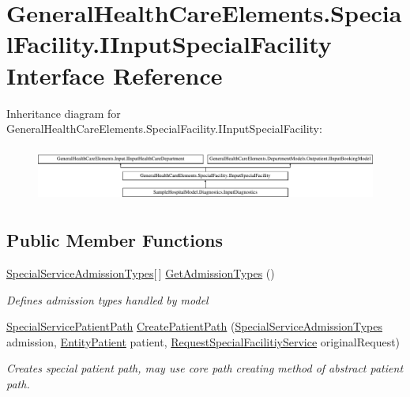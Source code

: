 \hypertarget{interface_general_health_care_elements_1_1_special_facility_1_1_i_input_special_facility}{}\section{General\+Health\+Care\+Elements.\+Special\+Facility.\+I\+Input\+Special\+Facility Interface Reference}
\label{interface_general_health_care_elements_1_1_special_facility_1_1_i_input_special_facility}
Inheritance diagram for General\+Health\+Care\+Elements.\+Special\+Facility.\+I\+Input\+Special\+Facility\+:\begin{figure}[H]
\begin{center}
\leavevmode
\includegraphics[height=1.814255cm]{interface_general_health_care_elements_1_1_special_facility_1_1_i_input_special_facility}
\end{center}
\end{figure}
\subsection*{Public Member Functions}
\begin{DoxyCompactItemize}
\item 
\hyperlink{class_general_health_care_elements_1_1_treatment_admission_types_1_1_special_service_admission_types}{Special\+Service\+Admission\+Types}\mbox{[}$\,$\mbox{]} \hyperlink{interface_general_health_care_elements_1_1_special_facility_1_1_i_input_special_facility_a5ff6abb9d0051ed2911d6d982da6b116}{Get\+Admission\+Types} ()
\begin{DoxyCompactList}\small\item\em Defines admission types handled by model \end{DoxyCompactList}\item 
\hyperlink{class_general_health_care_elements_1_1_special_facility_1_1_special_service_patient_path}{Special\+Service\+Patient\+Path} \hyperlink{interface_general_health_care_elements_1_1_special_facility_1_1_i_input_special_facility_a04adb110c4713d0f068165faacfc2e72}{Create\+Patient\+Path} (\hyperlink{class_general_health_care_elements_1_1_treatment_admission_types_1_1_special_service_admission_types}{Special\+Service\+Admission\+Types} admission, \hyperlink{class_general_health_care_elements_1_1_entities_1_1_entity_patient}{Entity\+Patient} patient, \hyperlink{class_general_health_care_elements_1_1_special_facility_1_1_request_special_facilitiy_service}{Request\+Special\+Facilitiy\+Service} original\+Request)
\begin{DoxyCompactList}\small\item\em Creates special patient path, may use core path creating method of abstract patient path. \end{DoxyCompactList}\end{DoxyCompactItemize}
